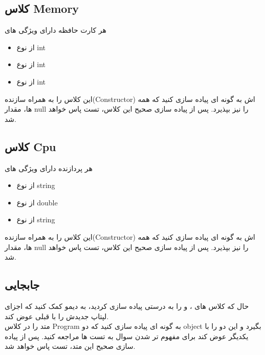     \subsection{
    کلاس Memory
    \grayBox{\textcolor{purple}{C\#}}
    }
    هر کارت حافظه دارای ویژگی های 
    \begin{itemize}
        \item 
             از نوع 
            int 
        \item
            
            از نوع
            int
        \item
        
            از نوع 
            int 
    \end{itemize}
    این کلاس را به همراه سازنده(Constructor) اش به گونه ای پیاده سازی کنید که همه 
    ها، مقدار null را نیز بپذیرد.
    پس از پیاده سازی صحیح این کلاس،
    تست
    \grayBox{\textcolor{dkgreen}{MemoryConstructor\_Tests}}
    پاس خواهد شد.
     
    \subsection{
    کلاس Cpu
    \grayBox{\textcolor{purple}{C\#}}
    }
    هر پردازنده دارای ویژگی های 
    \begin{itemize}
        \item 
             از نوع 
            string 
        \item
            
            از نوع
            double
        \item
        
            از نوع 
            string 
    \end{itemize}
    این کلاس را به همراه سازنده(Constructor) اش به گونه ای پیاده سازی کنید که همه 
    ها، مقدار null را نیز بپذیرد.
    پس از پیاده سازی صحیح این کلاس،
    تست
    \grayBox{\textcolor{dkgreen}{CpuConstructor\_Tests}}
    پاس خواهد شد.
    
    \subsection{
    جابجایی
    \grayBox{\textcolor{purple}{C\#}}
    }
    حال که کلاس های 
    ،
    و
    را به درستی پیاده سازی کردید،
    به دیمو کمک کنید که اجزای لپتاپ جدیدش را با قبلی عوض کند.
    \\
    متد 
    \grayBox{\textcolor{blue}{SwapConfigs}}
    را در کلاس Program
    به گونه ای پیاده سازی کنید که دو object بگیرد و این دو را با یکدیگر عوض کند برای مفهوم تر شدن سوال به تست ها مراجعه کنید.
    پس از پیاده سازی صحیح این متد،
    تست
    \grayBox{\textcolor{dkgreen}{SwapConfigs\_Tests}}
    پاس خواهد شد.
    
